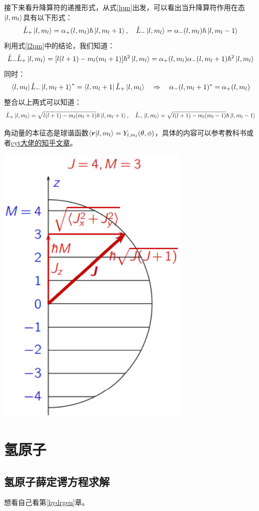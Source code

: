 接下来看升降算符的递推形式，从式\ref{lpm}出发，可以看出当升降算符作用在态$\ket{l,m_l}$具有以下形式：
\[\hat{L}_+\ket{l,m_l}=\alpha_+(l,m_l)\hbar\ket{l,m_l+1}, \quad \hat{L}_-\ket{l,m_l}=\alpha_-(l,m_l)\hbar\ket{l,m_l-1}\]
利用式\ref{l2pm}中的结论，我们知道：
\[\hat{L}_-\hat{L}_+\ket{l,m_l}=[l(l+1)-m_l(m_l+1)]\hbar^2\ket{l,m_l}=\alpha_+(l,m_l)\alpha_-(l,m_l+1)\hbar^2\ket{l,m_l}\]
同时：
\[\bra{l,m_l}\hat{L}_-\ket{l,m_l+1}^*=\bra{l,m_l+1}\hat{L}_+\ket{l,m_l} \quad \Rightarrow \quad \alpha_-(l,m_l+1)^*=\alpha_+(l,m_l)\]
整合以上两式可以知道：
\[\hat{L}_+\ket{l,m_l}=\sqrt{l(l+1)-m_l(m_l+1)}\hbar\ket{l,m_l+1}, \quad \hat{L}_-\ket{l,m_l}=\sqrt{l(l+1)-m_l(m_l-1)}\hbar\ket{l,m_l-1}\]

角动量的本征态是球谐函数$\bra{\bm{r}}\ket{l,m_l}=Y_{l,m_l}(\theta,\phi)$，具体的内容可以参考教科书或者\href{https://zhuanlan.zhihu.com/p/419492575}{cyt大佬的知乎文章}。

\begin{center}
    \includegraphics[scale=0.55]{fig/lzhx/微信图片_20211026130340.png}
\end{center}

\section{氢原子}
\subsection{氢原子薛定谔方程求解}
想看自己看第\ref{hydrgen}章。

